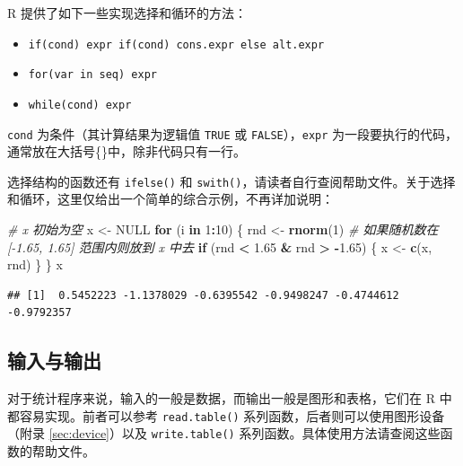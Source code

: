 \documentclass[
  b5paper,
  UTF8,twoside]{book}
\newenvironment{Shaded}{\begin{snugshade}}{\end{snugshade}}
\newcommand{\CommentTok}[1]{\textcolor[rgb]{0.56,0.35,0.01}{\textit{#1}}}
\newcommand{\ConstantTok}[1]{\textcolor[rgb]{0.56,0.35,0.01}{#1}}
\newcommand{\ControlFlowTok}[1]{\textcolor[rgb]{0.13,0.29,0.53}{\textbf{#1}}}
\newcommand{\DecValTok}[1]{\textcolor[rgb]{0.00,0.00,0.81}{#1}}
\newcommand{\FloatTok}[1]{\textcolor[rgb]{0.00,0.00,0.81}{#1}}
\newcommand{\FunctionTok}[1]{\textcolor[rgb]{0.13,0.29,0.53}{\textbf{#1}}}
\newcommand{\NormalTok}[1]{#1}
\newcommand{\OtherTok}[1]{\textcolor[rgb]{0.56,0.35,0.01}{#1}}
\newcommand{\SpecialCharTok}[1]{\textcolor[rgb]{0.81,0.36,0.00}{\textbf{#1}}}
\providecommand{\tightlist}{%
  \setlength{\itemsep}{0pt}\setlength{\parskip}{0pt}}
\begin{document}
R 提供了如下一些实现选择和循环的方法：

\begin{itemize}
\tightlist
\item
  \texttt{if(cond)\ expr\ if(cond)\ cons.expr\ else\ alt.expr}
\item
  \texttt{for(var\ in\ seq)\ expr}
\item
  \texttt{while(cond)\ expr}
\end{itemize}

\texttt{cond} 为条件（其计算结果为逻辑值 \texttt{TRUE} 或 \texttt{FALSE}），\texttt{expr} 为一段要执行的代码，通常放在大括号\{\}中，除非代码只有一行。

选择结构的函数还有 \texttt{ifelse()} 和 \texttt{swith()}，请读者自行查阅帮助文件。关于选择和循环，这里仅给出一个简单的综合示例，不再详加说明：

\begin{Shaded}
\begin{Highlighting}[]
\CommentTok{\# x 初始为空}
\NormalTok{x }\OtherTok{\textless{}{-}} \ConstantTok{NULL}
\ControlFlowTok{for}\NormalTok{ (i }\ControlFlowTok{in} \DecValTok{1}\SpecialCharTok{:}\DecValTok{10}\NormalTok{) \{}
\NormalTok{  rnd }\OtherTok{\textless{}{-}} \FunctionTok{rnorm}\NormalTok{(}\DecValTok{1}\NormalTok{)}
  \CommentTok{\# 如果随机数在 [{-}1.65, 1.65] 范围内则放到 x 中去}
  \ControlFlowTok{if}\NormalTok{ (rnd }\SpecialCharTok{\textless{}} \FloatTok{1.65} \SpecialCharTok{\&}\NormalTok{ rnd }\SpecialCharTok{\textgreater{}} \SpecialCharTok{{-}}\FloatTok{1.65}\NormalTok{) \{}
\NormalTok{    x }\OtherTok{\textless{}{-}} \FunctionTok{c}\NormalTok{(x, rnd)}
\NormalTok{  \}}
\NormalTok{\}}
\NormalTok{x}
\end{Highlighting}
\end{Shaded}

\begin{verbatim}
## [1]  0.5452223 -1.1378029 -0.6395542 -0.9498247 -0.4744612 -0.9792357
\end{verbatim}

\subsection{输入与输出}\label{ux8f93ux5165ux4e0eux8f93ux51fa}

对于统计程序来说，输入的一般是数据，而输出一般是图形和表格，它们在 R 中都容易实现。前者可以参考 \texttt{read.table()} 系列函数，后者则可以使用图形设备（附录 \ref{sec:device}）以及 \texttt{write.table()} 系列函数。具体使用方法请查阅这些函数的帮助文件。
\end{document}
